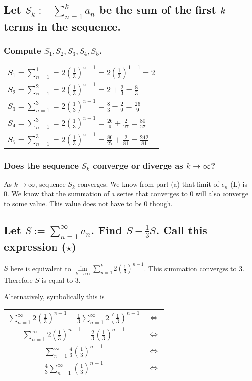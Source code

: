 \subsection{Let $S_k := \sum\limits_{n=1}^{k} a_n$ be the sum of the first $k$ terms in the sequence.}
\subsubsection{Compute $S_1, S_2, S_3, S_4, S_5$.}
\begin{center}
\begin{tabular}{l}
  $S_1 = \sum_{n=1}^1 = 2(\frac{1}{3})^{n-1} = 2(\frac{1}{3})^{1-1} = 2$ \\
  $S_2 = \sum_{n=1}^2 = 2(\frac{1}{3})^{n-1} = 2 + \frac{2}{3} = \frac{8}{3}$ \\
  $S_3 = \sum_{n=1}^3 = 2(\frac{1}{3})^{n-1} = \frac{8}{3} + \frac{2}{9} = \frac{26}{9}$ \\
  $S_4 = \sum_{n=1}^3 = 2(\frac{1}{3})^{n-1} = \frac{26}{9} + \frac{2}{27} = \frac{80}{27}$ \\
  $S_5 = \sum_{n=1}^3 = 2(\frac{1}{3})^{n-1} = \frac{80}{27} + \frac{2}{81} = \frac{242}{81}$ \\
\end{tabular}
\end{center}

\subsubsection{Does the sequence $S_k$ converge or diverge as $k \rightarrow \infty$?}
As $k \rightarrow \infty$, sequence $S_k$ converges. We know from part (a) that limit of $a_n$ (L) is 0. We know that the summation of a series that converges to 0 will also converge to some value. This value does not have to be 0 though.

\subsection{Let $S := \sum\limits_{n=1}^{\infty} a_n$. Find $S - \frac{1}{3}S$. Call this expression ($\star$)}
$S$ here is equivalent to $\lim\limits_{k \rightarrow \infty} \sum\limits_{n=1}^k 2(\frac{1}{3})^{n-1}$. This summation converges to 3. Therefore $S$ is equal to 3.

Alternatively, symbolically this is
\begin{center}
  \begin{tabular}{cc}
    $\sum\limits_{n=1}^\infty 2(\frac{1}{3})^{n-1} - \frac{1}{3}\sum\limits_{n=1}^\infty 2(\frac{1}{3})^{n-1}$ & $\iff$ \\
    $\sum\limits_{n=1}^\infty 2(\frac{1}{3})^{n-1} - \frac{2}{3}(\frac{1}{3})^{n-1}$ & $\iff$ \\
    $\sum\limits_{n=1}^\infty \frac{4}{3}(\frac{1}{3})^{n-1}$ & $\iff$ \\
    $\frac{4}{3} \sum\limits_{n=1}^\infty (\frac{1}{3})^{n-1}$ & $\iff$ \\
  \end{tabular}
\end{center}

